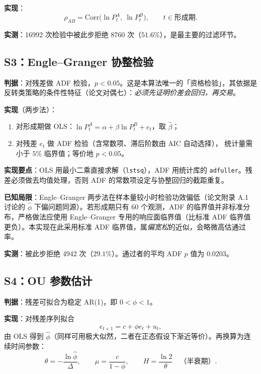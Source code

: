 \textbf{实现}：
\begin{equation}
\rho_{AB}=\mathrm{Corr}\bigl(\ln P^A_t,\ \ln P^B_t\bigr),\qquad t\in\text{形成期}.
\end{equation}

\textbf{实测}：16992 次检验中被此步拒绝 8760 次（$51.6\%$），是最主要的过滤环节。

\subsection{S3：Engle--Granger 协整检验}

\textbf{判据}：对残差做 ADF 检验，$p<0.05$。这是本算法唯一的「资格检验」，其依据是反转类策略的条件性特征（论文对偶七）：\emph{必须先证明价差会回归，再交易}。

\textbf{实现}（两步法\cite{englegranger1987}）：

\begin{enumerate}[leftmargin=2.2em]
  \item 对形成期做 OLS：$\ln P^A_t=\alpha+\beta\ln P^B_t+e_t$，取 $\hat\beta$；
  \item 对残差 $e_t$ 做 ADF 检验（含常数项、滞后阶数由 AIC 自动选择\cite{dickeyfuller1979}），
        统计量需小于 $5\%$ 临界值；等价地 $p<0.05$。
\end{enumerate}

\textbf{实现要点}：OLS 用最小二乘直接求解（\texttt{lstsq}），ADF 用统计库的 \texttt{adfuller}。残差必须做去均值处理，否则 ADF 的常数项设定与协整回归的截距重复。

\textbf{已知局限}：Engle--Granger 两步法在样本量较小时检验功效偏低（论文附录 A.1 讨论的 $\hat\phi$ 下偏问题同源）。若形成期只有 60 个观测，ADF 的临界值并非标准分布，严格做法应使用 Engle--Granger 专用的响应面临界值（比标准 ADF 临界值更负）。本实现在此采用标准 ADF 临界值，属\emph{偏宽松}的近似，会略微高估通过率。

\textbf{实测}：被此步拒绝 4942 次（$29.1\%$）。通过者的平均 ADF $p$ 值为 $0.0203$。

\subsection{S4：OU 参数估计}

\textbf{判据}：残差可拟合为稳定 AR(1)，即 $0<\phi<1$。

\textbf{实现}：对残差序列拟合
\begin{equation}
e_{t+1}=c+\phi e_t+u_t ,
\end{equation}
由 OLS 得到 $\hat\phi$（同样可用极大似然，二者在正态假设下渐近等价）。再换算为连续时间参数：
\begin{equation}
\theta=-\frac{\ln\hat\phi}{\Delta},\qquad
\mu=\frac{c}{1-\phi},\qquad
H=\frac{\ln 2}{\theta}\quad\text{（半衰期）}.
\end{equation}

